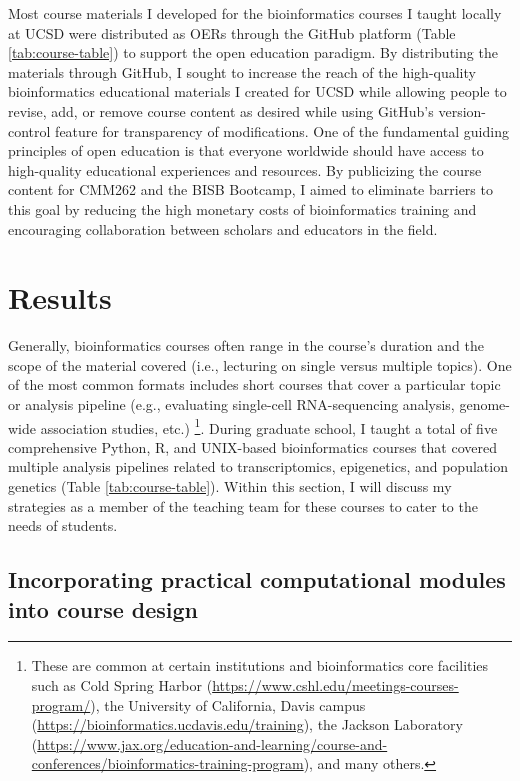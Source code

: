 Most course materials I developed for the bioinformatics courses I taught locally at UCSD were distributed as OERs through the GitHub platform (Table \ref{tab:course-table}) to support the open education paradigm. By distributing the materials through GitHub, I sought to increase the reach of the high-quality bioinformatics educational materials I created for UCSD while allowing people to revise, add, or remove course content as desired while using GitHub's version-control feature for transparency of modifications. One of the fundamental guiding principles of open education is that everyone worldwide should have access to high-quality educational experiences and resources. By publicizing the course content for CMM262 and the BISB Bootcamp, I aimed to eliminate barriers to this goal by reducing the high monetary costs of bioinformatics training and encouraging collaboration between scholars and educators in the field.

\section{Results}

Generally, bioinformatics courses often range in the course's duration and the scope of the material covered (i.e., lecturing on single versus multiple topics). One of the most common formats includes short courses that cover a particular topic or analysis pipeline (e.g., evaluating single-cell RNA-sequencing analysis, genome-wide association studies, etc.) \footnote{These are common at certain institutions and bioinformatics core facilities such as Cold Spring Harbor (\url{https://www.cshl.edu/meetings-courses-program/}), the University of California, Davis campus (\url{https://bioinformatics.ucdavis.edu/training}), the Jackson Laboratory (\url{https://www.jax.org/education-and-learning/course-and-conferences/bioinformatics-training-program}), and many others.}. During graduate school, I taught a total of five comprehensive Python, R, and UNIX-based bioinformatics courses that covered multiple analysis pipelines related to transcriptomics, epigenetics, and population genetics (Table \ref{tab:course-table}). Within this section, I will discuss my strategies as a member of the teaching team for these courses to cater to the needs of students.

\subsection{Incorporating practical computational modules into course design}


